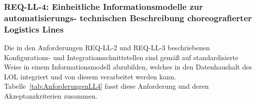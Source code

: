 \subsubsection[REQ-LL-4: Einheitliche Informationsmodelle zur automatisierungstechnischen Beschreibung choreografierter Logistics Lines]{REQ-LL-4: Einheitliche Informationsmodelle zur automatisierungs- technischen Beschreibung choreografierter Logistics Lines}

Die in den Anforderungen REQ-LL-2 und REQ-LL-3 beschriebenen Konfigurations- und Integrationsschnittstellen sind gemäß \cite{NAMURAK4.19.2020} auf standardisierte Weise in einem Informationsmodell abzubilden, welches in den Datenhaushalt des LOL integriert und von diesem verarbeitet werden kann. Tabelle~\ref{tab:AnforderungenLL4} fasst diese Anforderung und deren Akzeptanzkriterien zusammen.


